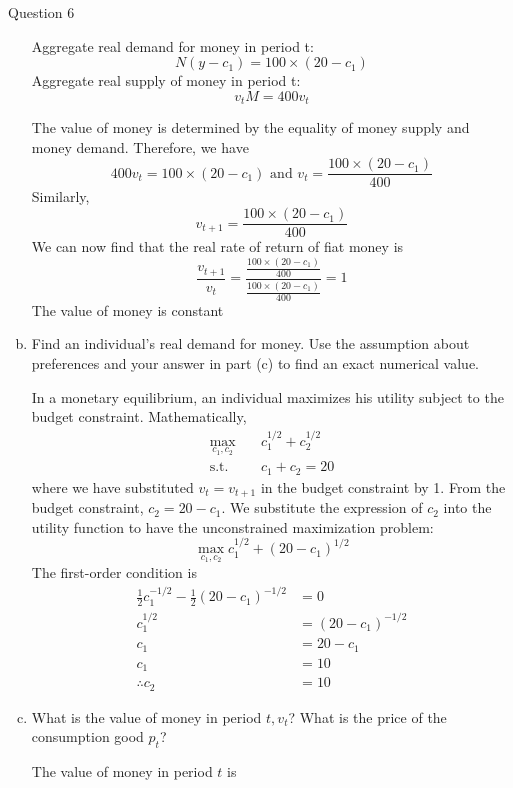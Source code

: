 \documentclass[a4paper]{article}
\newif\IfInSansMode
\numberwithin{equation}{section}
\numberwithin{figure}{section}
\begin{document}
\begin{questionbox}{Question 6}
\begin{enumerate}[(a)]
			\begin{explanationbox}
				Aggregate real demand for money in period t:
				\[
					N (y-c_1) = 100 \times (20 - c_1)
				\]
				Aggregate real supply of money in period t:
				\[
					v_tM = 400v_t
				\]
			\end{explanationbox}
			\begin{explanationbox}
				The value of money is determined by the equality of money supply and money demand. Therefore, we have
				\[
					400v_t = 100 \times (20-c_1) \text{ and } v_t = \frac{100\times(20-c_1)}{400}
				\]
				Similarly,
				\[
					v_{t+1} = \frac{100\times(20-c_1)}{400}
				\]
				We can now find that the real rate of return of fiat money is
				\[
					\frac{v_{t+1}}{v_t} = \frac{\frac{100\times(20-c_1)}{400}}{\frac{100\times(20-c_1)}{400}}=1
				\]
				The value of money is constant
			\end{explanationbox}
			\item Find an individual's real demand for money. Use the assumption about preferences and your answer in part (c) to find an exact numerical value.
			\begin{explanationbox}
				In a monetary equilibrium, an individual maximizes his utility subject to the budget constraint. Mathematically,
			\begin{align*}
				\max_{c_1,c_2}\quad& c_1^{1/2} + c_2^{1/2}\\
				\text{s.t.}\quad& c_1 + c_2 = 20
			\end{align*}
			where we have substituted \( v_t=v_{t+1} \) in the budget constraint by 1. From the budget constraint, \( c_2 = 20 - c_1 \). We substitute the expression of \( c_2 \) into the utility function to have the unconstrained maximization problem:
			\[
				\max_{c_1,c_2} c_1^{1/2} + (20-c_1)^{1/2}
			\]
			The first-order condition is
			\begin{align*}
				\frac{1}{2}c_1^{-1/2}-\frac{1}{2}(20-c_1)^{-1/2}&=0\\
				c_1^{1/2} &= (20-c_1)^{-1/2}\\
				c_1 &= 20-c_1\\
				c_1 &= 10\\
				\therefore c_2 &= 10
			\end{align*}
			\end{explanationbox}
			\item What is the value of money in period \( t, v_t \)? What is the price of the consumption good \( p_t \)?
			\begin{explanationbox}
				The value of money in period \(t\) is

\end{explanationbox}
\end{enumerate}
\end{questionbox}
\end{document}
